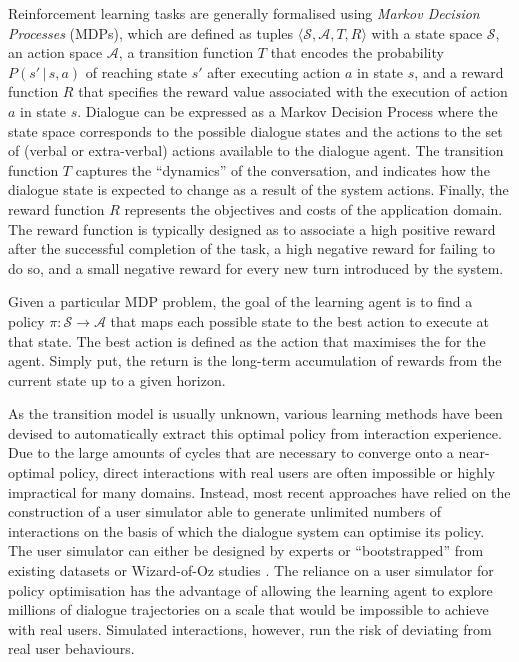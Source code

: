 Reinforcement learning tasks are generally formalised using \textit{Markov Decision Processes} (MDPs), which are defined as tuples $\langle \mathcal{S}, \mathcal{A}, T, R \rangle$ with a state space $\mathcal{S}$, an action space $\mathcal{A}$, a transition function $T$ that encodes  the probability $P(s'\, | \, s,a)$ of reaching state $s'$ after executing action $a$ in state $s$, and a reward function $R$ that specifies the reward value associated with the execution of action $a$ in state $s$. Dialogue can be expressed as a Markov Decision Process where the state space corresponds to the possible dialogue states and the actions to the set of (verbal or extra-verbal) actions available to the dialogue agent.  The transition function $T$ captures the ``dynamics'' of the conversation, and indicates how the dialogue state is expected to change as a result of the system actions. Finally, the reward function $R$ represents the objectives and costs of the application domain.  The reward function is typically designed as to associate a high positive reward after the successful completion of the task, a high negative reward for failing to do so, and a small negative reward for every new turn introduced by the system.


Given a particular MDP problem, the goal of the learning agent is to find a policy $\pi: \mathcal{S} \rightarrow \mathcal{A}$ that maps each possible state to the best action to execute at that state.  The best action is defined as the action that maximises the  for the agent.  Simply put, the return is the long-term accumulation of rewards from the current state up to a given horizon. 

As the transition model is usually unknown, various learning methods have been devised to automatically extract this optimal policy from interaction experience. Due to the large amounts of cycles that are necessary to converge onto a near-optimal policy, direct interactions with real users are often impossible or highly impractical for many domains. Instead, most recent approaches have relied on the construction of a user simulator able to generate unlimited numbers of interactions on the basis of which the dialogue system can optimise its policy.  
The user simulator can either be designed by experts  or ``bootstrapped'' from existing datasets  or Wizard-of-Oz studies \citep{InTech_RL_2008_OP,FramptonL09,RieserLemon11}. The reliance on a user simulator for policy optimisation has the advantage of allowing the learning agent to explore millions of dialogue trajectories on a scale that would be impossible to achieve with real users.  Simulated interactions, however, run the risk of deviating from real user behaviours.


